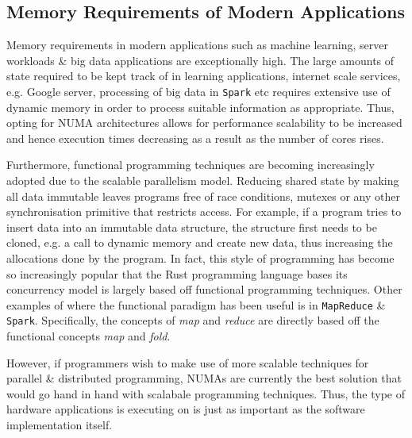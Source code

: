\documentclass{paper}\usepackage{graphicx}
\begin{document}

\subsection{Memory Requirements of Modern Applications}
\label{sec:memory_requirements}

Memory requirements in modern applications such as machine learning, server workloads \& big data applications are exceptionally high. The large amounts of state required to be kept track of in learning applications, internet scale services, e.g. Google server, processing of big data in \lstinline{Spark} etc requires extensive use of dynamic memory in order to process suitable information as appropriate. Thus, opting for NUMA architectures allows for performance scalability to be increased and hence execution times decreasing as a result as the number of cores rises.

Furthermore, functional programming techniques are becoming increasingly adopted due to the scalable parallelism model. Reducing shared state by making all data immutable leaves programs free of race conditions, mutexes or any other synchronisation primitive that restricts access. For example, if a program tries to insert data into an immutable data structure, the structure first needs to be cloned, e.g. a call to dynamic memory and create new data, thus increasing the allocations done by the program. In fact, this style of programming has become so increasingly popular that the Rust programming language bases its concurrency model is largely based off functional programming techniques. Other examples of where the functional paradigm has been useful is in \lstinline{MapReduce} \& \lstinline{Spark}. Specifically, the concepts of \textit{map} and \textit{reduce} are directly based off the functional concepts \textit{map} and \textit{fold}.

However, if programmers wish to make use of more scalable techniques for parallel \& distributed programming, NUMAs are currently the best solution that would go hand in hand with scalabale programming techniques. Thus, the type of hardware applications is executing on is just as important as the software implementation itself.
\end{document}
